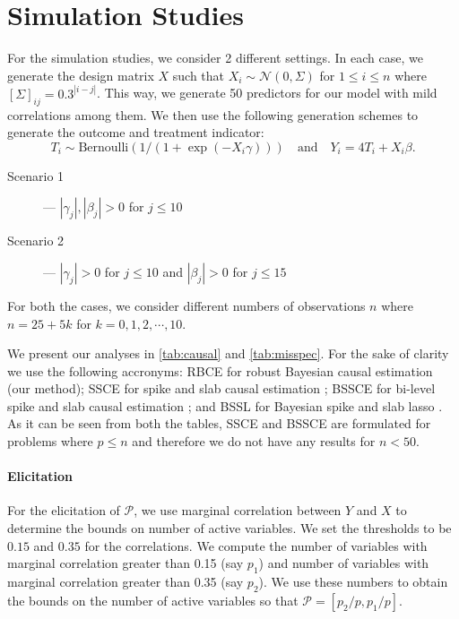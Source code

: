 \documentclass[preprint,12pt]{elsarticle}
\begin{document}
\section{Simulation Studies}\label{sec:sim}

For the simulation studies, we consider 2 different settings. In each
case, we generate the design matrix $X$ such that $X_i\sim\mathcal{N}(0, \Sigma)$
for $1\le i\le n$ where $[\Sigma]_{ij} = 0.3^{|i-j|}$. This way, we 
generate 50 predictors for our model with mild correlations among them.
We then use the following generation schemes to generate the outcome and
treatment indicator: 
\begin{equation}
    T_i \sim \text{Bernoulli}\left(1/(1+\exp(-X_i\gamma))\right)
    \quad\text{and}\quad
    Y_i = 4T_i + X_i\beta.
\end{equation}
\begin{description}
    \item[Scenario 1] --- $|\gamma_j|, |\beta_j|>0$ for $j\le 10$
    \item[Scenario 2] --- $|\gamma_j|>0$ for $j\le 10$ and $|\beta_j|>0$ for $j\le 15$
\end{description}
For both
the cases, we consider different numbers of observations $n$ where
$n=25+ 5k$ for $k=0,1,2,\cdots,10$. %

We present our analyses in \cref{tab:causal} and \cref{tab:misspec}.
For the sake of clarity we use the following accronyms: RBCE for 
robust Bayesian causal estimation (our method); SSCE for spike and
slab causal estimation \cite{koch2020}; BSSCE for bi-level spike and slab causal
estimation \cite{koch2020}; and BSSL for Bayesian spike and slab lasso
\cite{xu2015}. As it can be
seen from both the tables, SSCE and BSSCE are formulated for problems
where $p\le n$ and therefore we do not have any results for $n<50$.

\paragraph{Elicitation} For the
elicitation of $\mathcal{P}$, we use marginal correlation between 
$Y$ and $X$ to determine the bounds on number of active variables. We 
set the thresholds to be $0.15$ and $0.35$ for the correlations. We compute the
number of variables with marginal correlation greater than 0.15
(say $p_1$) and number of variables with  marginal 
correlation greater than 0.35 (say $p_2$). 
We use these numbers to obtain the bounds on the number of active
variables so that $\mathcal{P}=[p_2/p , p_1/p]$.
\end{document}
